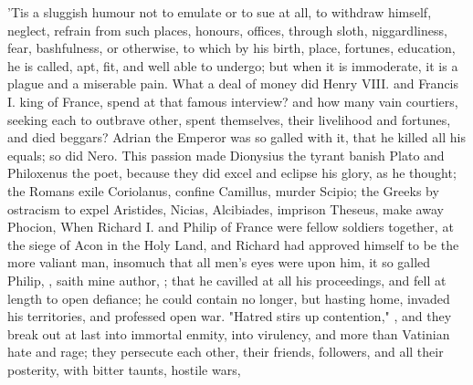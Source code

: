 
'Tis a sluggish humour not to emulate or to sue at all, to withdraw himself,
neglect, refrain from such places, honours, offices, through sloth,
niggardliness, fear, bashfulness, or otherwise, to which by his birth, place,
fortunes, education, he is called, apt, fit, and well able to undergo; but when
it is immoderate, it is a plague and a miserable pain. What a deal of money did
Henry VIII. and Francis I. king of France, spend at that
famous interview? and how many vain courtiers, seeking
each to outbrave other, spent themselves, their livelihood and fortunes, and
died beggars? Adrian the Emperor was so galled with it,
that he killed all his equals; so did Nero. This passion made
Dionysius the tyrant banish Plato and Philoxenus the poet,
because they did excel and eclipse his glory, as he thought; the Romans exile
Coriolanus, confine Camillus, murder Scipio; the Greeks by ostracism to expel
Aristides, Nicias, Alcibiades, imprison Theseus, make away Phocion, \etc{} When
Richard I. and Philip of France were fellow soldiers together, at the siege of
Acon in the Holy Land, and Richard had approved himself to be the more valiant
man, insomuch that all men's eyes were upon him, it so galled Philip,
, saith mine author,
;
that he cavilled at all his proceedings, and fell at length to open defiance;
he could contain no longer, but hasting home, invaded his territories, and
professed open war. "Hatred stirs up contention," ,
and they break out at last into immortal enmity, into virulency, and more than
Vatinian hate and rage; they persecute each other, their
friends, followers, and all their posterity, with bitter taunts, hostile wars,
